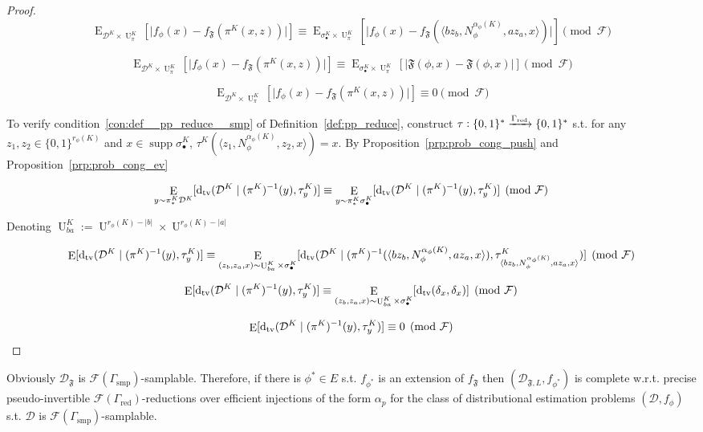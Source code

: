 \documentclass{article}
\numberwithin{equation}{section}
\theoremstyle{definition}
\theoremstyle{plain}
\newcommand{\Bool}{\{0,1\}}
\newcommand{\Words}{{\Bool^*}}
\DeclareMathOperator{\Supp}{supp}
\DeclareMathOperator{\E}{E}
\DeclareMathOperator{\Un}{U}
\newcommand{\Dtv}{\operatorname{d}_{\textnormal{tv}}}
\newcommand{\Abs}[1]{\lvert #1 \rvert}
\newcommand{\Chev}[1]{\langle #1 \rangle}
\newcommand{\Dist}{\mathcal{D}}
\newcommand{\Fall}{\mathcal{F}}
\begin{document}
\begin{proof}
\[\E_{\Dist^K \times \Un_\pi^K}[\Abs{f_\phi(x)-f_{\mathfrak{F}}(\pi^K(x,z))}] \equiv \E_{\sigma_\bullet^K \times \Un_\pi^K}[\Abs{f_\phi(x)-f_{\mathfrak{F}}(\Chev{bz_b,N_\phi^{\alpha_\phi(K)},az_a,x})}] \pmod{\Fall}\]

\[\E_{\Dist^K \times \Un_\pi^K}[\Abs{f_\phi(x)-f_{\mathfrak{F}}(\pi^K(x,z))}] \equiv \E_{\sigma_\bullet^K \times \Un_\pi^K}[\Abs{\mathfrak{F}(\phi,x)-\mathfrak{F}(\phi,x)}] \pmod{\Fall}\]

\[\E_{\Dist^K \times \Un_\pi^K}[\Abs{f_\phi(x)-f_{\mathfrak{F}}(\pi^K(x,z))}] \equiv 0 \pmod{\Fall}\]

To verify condition~\ref{con:def__pp_reduce__smp} of Definition~\ref{def:pp_reduce}, construct ${\tau: \Words \xrightarrow{\Gamma_{\textnormal{red}}} \Words}$ s.t. for any\\ ${z_1,z_2 \in \Bool^{r_\phi(K)}}$ and ${x \in \Supp \sigma_\bullet^K}$, ${\tau^K(\Chev{z_1,N_\phi^{\alpha_\phi(K)},z_2,x})=x}$. By Proposition~\ref{prp:prob_cong_push} and Proposition~\ref{prp:prob_cong_ev}

\[\E_{y \sim \pi_*^K\Dist^K}[\Dtv(\Dist^K \mid (\pi^K)^{-1}(y),\tau_y^K)] \equiv \E_{y \sim \pi_*^K\sigma_\bullet^K}[\Dtv(\Dist^K \mid (\pi^K)^{-1}(y),\tau_y^K)] \pmod{\Fall}\]

Denoting ${\Un_{ba}^K:=\Un^{r_\phi(K)-\Abs{b}} \times \Un^{r_\phi(K)-\Abs{a}}}$

\[\E[\Dtv(\Dist^K \mid (\pi^K)^{-1}(y),\tau_y^K)] \equiv \E_{(z_b,z_a,x) \sim \Un_{ba}^K \times \sigma_\bullet^K}[\Dtv(\Dist^K \mid (\pi^K)^{-1}(\Chev{bz_b,N_\phi^{\alpha_\phi(K)},az_a,x}),\tau_{\Chev{bz_b,N_\phi^{\alpha_\phi(K)},az_a,x}}^K)] \pmod{\Fall}\]

\[\E[\Dtv(\Dist^K \mid (\pi^K)^{-1}(y),\tau_y^K)] \equiv \E_{(z_b,z_a,x) \sim \Un_{ba}^K \times \sigma_\bullet^K}[\Dtv(\delta_x,\delta_x)] \pmod{\Fall}\]

\[\E[\Dtv(\Dist^K \mid (\pi^K)^{-1}(y),\tau_y^K)] \equiv 0 \pmod{\Fall}\]
%
\end{proof}

Obviously ${\Dist_{\mathfrak{F}}}$ is ${\Fall(\Gamma_{\text{smp}})}$-samplable. Therefore, if there is ${\phi^* \in E}$ s.t. ${f_{\phi^*}}$ is an extension of ${f_{\mathfrak{F}}}$ then ${(\Dist_{\mathfrak{F},L},f_{\phi^*})}$ is complete w.r.t. precise pseudo-invertible ${\Fall(\Gamma_{\text{red}})}$-reductions over efficient injections of the form ${\alpha_p}$ for the class of distributional estimation problems ${(\Dist,f_\phi)}$ s.t. ${\Dist}$ is ${\Fall(\Gamma_{\text{smp}})}$-samplable. 
\end{document}
